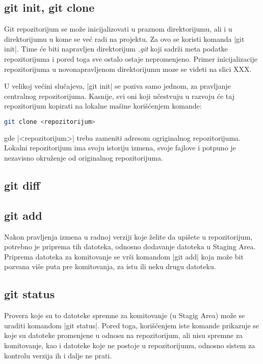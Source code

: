\documentclass[a4paper]{article}
\begin{document}
{\subsection{git init, git clone}
\label{subsec:git_init}
Git repozitorijum se može inicijalizovati u praznom direktorijumu, ali i u direktorijumu u kome se već radi na projektu. Za ovo se koristi komanda |git init|. Time će biti napravljen direktorijum \textit{.git} koji sadrži meta podatke repozitorijuma i pored toga sve ostalo ostaje nepromenjeno. Primer inicijalizacije repozitorijuma u novonapravljenom direktorijumu moze se videti na slici XXX.

U velikoj većini slučajeva, |git init| se poziva samo jednom, za pravljanje centralnog repozitorijuma. Kasnije, svi oni koji učestvuju u razvoju će taj repozitorijum kopirati na lokalne mašine korišćenjem komande:
\begin{lstlisting}[language=bash]
git clone <repozitorijum>
\end{lstlisting}
\noindent
gde |<repozitorijum>| treba zameniti adresom ogriginalnog repozitorijuma. Lokalni repozitorijum ima svoju istoriju izmena, svoje fajlove i potpuno je nezavisno okruženje od originalnog repozitorijuma. 


\subsection{git diff}
\label{subsec:git_diff}


\subsection{git add}
\label{subsec:git_add}
Nakon pravljenja izmena u radnoj verziji koje želite da upišete u repozitorijum, potrebno je priprema tih datoteka, odnosno dodavanje datoteka u Staging Area. Priprema datoteka za komitovanje se vrši komandom |git add| koja može bit pozvana više puta pre komitovanja, za istu ili neku drugu datoteku.



\subsection{git status}
\label{subsec:git_status}
Provera koje su to datoteke spremne za komitovanje (u Stagig Area) može se uraditi komandom |git status|. Pored toga, korišćenjem iste komande prikazuje se koje su datoteke promenjene u odnosu na repozitorijum, ali nisu spremne za komitovanje, kao i datoteke koje ne postoje u repozitorijumu, odnosno sistem za kontrolu verzija ih i dalje ne prati.


}
\end{document}
